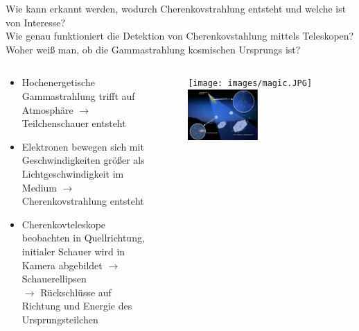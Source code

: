   \begin{frame}{Wie kann erkannt werden, wodurch Cherenkovstrahlung entsteht und welche ist von Interesse?\\
  Wie genau funktioniert die Detektion von Cherenkovstahlung mittels Teleskopen?\\
  Woher weiß man, ob die Gammastrahlung kosmischen Ursprungs ist?}
    \begin{columns}
   \begin{column}{0.5\textwidth}
    \begin{itemize}
      \setlength\itemsep{2em}
      \item  Hochenergetische Gammastrahlung trifft auf Atmosphäre $\rightarrow$ Teilchenschauer entsteht
      \item  Elektronen bewegen sich mit Geschwindigkeiten größer als Lichtgeschwindigkeit im Medium $\rightarrow$ Cherenkovstrahlung entsteht
      \item  Cherenkovteleskope beobachten in Quellrichtung, initialer Schauer wird in Kamera abgebildet $\rightarrow$ Schauerellipsen\\[1.5em]
            $\longrightarrow$ Rückschlüsse auf Richtung und Energie des Ursprungsteilchen

    \end{itemize}
  \vspace{2em}
  \end{column}
  \begin{column}{0.5\textwidth}
  \begin{figure}
    \centering
    \texttt{[image: images/magic.JPG]}\\
    \includegraphics[width=0.5\textwidth]{images/cta_schauer.png}
  \end{figure}
  \end{column}
    \end{columns}
  \end{frame}


